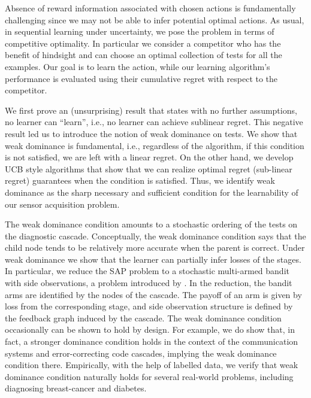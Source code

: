 Absence of reward information associated with chosen actions is fundamentally challenging since we may not be able to infer potential optimal actions. As usual, in sequential learning under uncertainty, we pose the problem in terms of competitive optimality. In particular we consider a competitor who has the benefit of hindsight and can choose an optimal collection of tests for all the examples. Our goal is to learn the action, while our learning algorithm's performance is evaluated using their  cumulative regret with respect to the competitor.

We first prove an (unsurprising) result that states 
with no further assumptions, no learner can ``learn'', i.e., no learner can achieve sublinear regret.
This negative result led us to introduce the notion of weak dominance on tests. 
We show that weak dominance is fundamental, i.e., regardless of the algorithm, if this condition is not satisfied, we are left with a linear regret. On the other hand, we develop UCB style algorithms that show that we can realize optimal regret (sub-linear regret) guarantees when the condition is satisfied. 
Thus, we identify weak dominance as the sharp necessary and sufficient condition for the learnability of
our sensor acquisition problem.

The weak dominance condition amounts to a stochastic ordering of the tests on the diagnostic cascade. 
Conceptually, the weak dominance condition says that the child node tends to be relatively more accurate when the parent is correct. 
Under weak dominance we show that the learner can partially infer losses of the stages. 
In particular, we reduce the SAP problem to a stochastic multi-armed bandit with side observations, 
a problem introduced by \citet{MaSh11}.
In the reduction, the bandit arms are identified by the nodes of the cascade. 
The payoff of an arm is given by loss from the corresponding stage, and side observation structure is defined by the feedback graph induced by the cascade. 
The weak dominance condition occasionally can be shown to hold by design. For example, we do show that,
in fact, a stronger dominance condition holds in the context of the communication systems 
and error-correcting code cascades, implying the weak dominance condition there.
Empirically, with the help of labelled data, 
we verify that weak dominance condition naturally holds for several real-world problems,
including diagnosing breast-cancer and diabetes.

